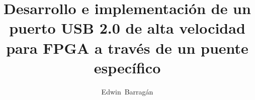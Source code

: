 \documentclass[12pt,a4paper,twosides,openright]{report}
\title{Desarrollo e implementación de un puerto USB 2.0 de alta velocidad para
	FPGA a través de un puente específico}
\author{Edwin~Barragán}
\begin{document}
	
		\renewcommand{\tablename}{Tabla}

		

		

		\tableofcontents

		
		
\end{document}
